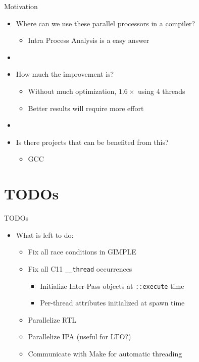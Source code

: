 \begin{frame}{Motivation}
  \begin{itemize}
    \item Where can we use these parallel processors in a compiler?
        \begin{itemize}
            \item Intra Process Analysis is a easy answer
        \end{itemize}
    \item []
    \item How much the improvement is?
        \begin{itemize}
            \item Without much optimization, $1.6\times$ using 4 threads
            \item Better results will require more effort
        \end{itemize}

    \item []
    \item Is there projects that can be benefited from this?
        \begin{itemize}
            \item GCC
        \end{itemize}
  \end{itemize}
\end{frame}

\section{TODOs}

\begin{frame}{TODOs}
    \begin{itemize}
        \item What is left to do:
            \begin{itemize}
                \item Fix all race conditions in GIMPLE
                \item Fix all C11 \texttt{\_\_thread} occurrences
                    \begin{itemize}
                        \item Initialize Inter-Pass objects at \texttt{::execute} time
                        \item Per-thread attributes initialized at spawn time
                    \end{itemize}
                \item Parallelize RTL
                \item Parallelize IPA (useful for LTO?)
                \item Communicate with Make for automatic threading
            \end{itemize}
    \end{itemize}
\end{frame}

